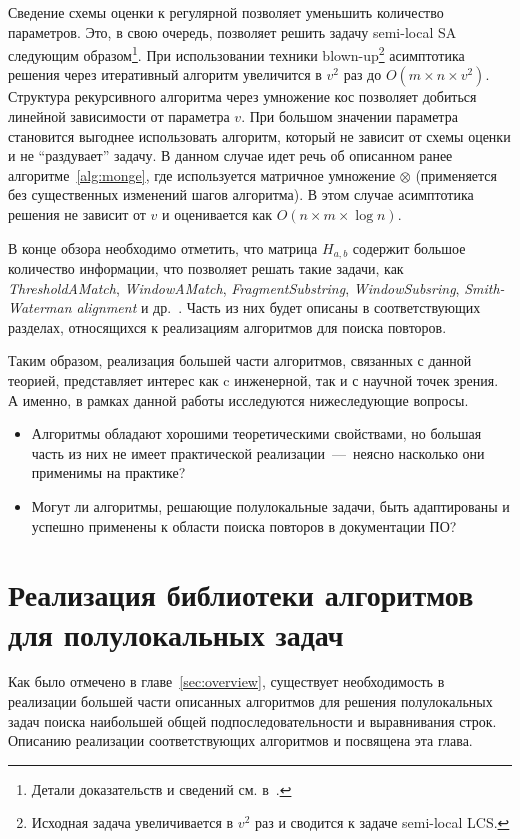 Сведение схемы оценки к регулярной позволяет уменьшить количество параметров.
Это, в свою очередь, позволяет решить задачу semi-local SA следующим образом\footnote{Детали доказательств и сведений см. в~\cite{tiskin2006all}.}. 
При использовании техники blown-up\footnote{Исходная задача увеличивается в $v^2$ раз и сводится к задаче {semi-local LCS}.} асимптотика решения через итеративный алгоритм увеличится в $v^2$ раз до $O(m \times n \times v^2)$.
Структура рекурсивного алгоритма через умножение кос позволяет добиться линейной зависимости от параметра $v$. 
При большом значении параметра становится выгоднее использовать алгоритм, который не зависит от схемы оценки и не ``раздувает'' задачу. 
В данном случае идет речь об описанном ранее алгоритме~\ref{alg:monge}, где используется матричное умножение $\otimes$ (применяется без существенных изменений шагов алгоритма).
В этом случае асимптотика решения не зависит от $v$ и оценивается как $O(n \times m \times \log n)$.

В конце обзора необходимо отметить, что матрица $H_{a,b}$ содержит большое количество информации, что позволяет решать такие задачи, как \emph{ThresholdAMatch}, \emph{WindowAMatch}, \emph{FragmentSubstring}, \emph{WindowSubsring}, \emph{Smith-Waterman alignment} и др.~\cite{tiskin2006all}. 
Часть из них будет описаны в соответствующих разделах, относящихся к реализациям алгоритмов для поиска повторов.

Таким образом, реализация большей части алгоритмов, связанных с данной теорией, представляет интерес как c инженерной, так и с научной точек зрения.
А именно, в рамках данной работы исследуются нижеследующие вопросы.
\begin{itemize}
\item Алгоритмы обладают хорошими теоретическими свойствами, но большая часть из них не имеет практической реализации~---~неясно насколько они применимы на практике?
\item Могут ли алгоритмы, решающие полулокальные задачи, быть адаптированы и успешно применены к области поиска повторов в документации ПО?
\end{itemize}



\section{Реализация библиотеки алгоритмов для полулокальных задач}\label{librarySection}
Как было отмечено %
в главе~\ref{sec:overview},
существует необходимость в реализации большей части описанных алгоритмов для решения полулокальных задач поиска наибольшей общей подпоследовательности и выравнивания строк.
Описанию реализации соответствующих алгоритмов и посвящена эта глава.

